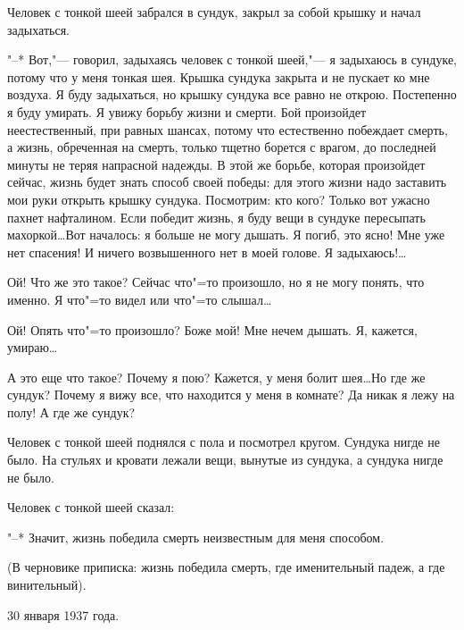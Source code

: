 Человек с тонкой шеей забрался в сундук, закрыл за собой крышку и начал задыхаться.

"--* Вот,"--- говорил, задыхаясь человек с тонкой шеей,"--- я задыхаюсь в сундуке, потому что у меня тонкая шея. Крышка сундука закрыта и не пускает ко мне воздуха. Я буду задыхаться, но крышку сундука все равно не открою. Постепенно я буду умирать. Я увижу борьбу жизни и смерти. Бой произойдет неестественный,  при равных шансах, потому что естественно  побеждает смерть, а жизнь, обреченная на смерть, только тщетно борется с врагом, до последней минуты не теряя напрасной надежды. В этой же  борьбе, которая произойдет сейчас, жизнь  будет знать способ своей победы: для этого жизни надо заставить мои руки открыть крышку сундука. Посмотрим: кто кого? Только вот ужасно пахнет нафталином. Если победит жизнь, я буду вещи в  сундуке пересыпать  махоркой\dots Вот началось: я больше не могу дышать. Я погиб, это ясно! Мне уже нет спасения! И ничего возвышенного нет в моей голове. Я задыхаюсь!\dots

Ой! Что же это такое? Сейчас что"=то произошло, но я не могу понять, что  именно. Я что"=то видел или что"=то слышал\dots

Ой! Опять что"=то произошло? Боже мой! Мне нечем дышать. Я, кажется, умираю\dots

А это еще что такое? Почему я пою? Кажется, у меня болит шея\dots Но где же сундук? Почему я вижу все, что находится у меня в комнате? Да никак я лежу на полу! А где же сундук?

Человек с тонкой шеей поднялся с пола и посмотрел кругом. Сундука нигде не было. На стульях и кровати лежали вещи, вынутые из сундука, а сундука нигде не было.

Человек с тонкой шеей сказал:

"--* Значит, жизнь победила смерть неизвестным для меня способом.

(В черновике приписка: жизнь победила смерть, где именительный падеж, а где винительный).

\begin{flushright}30 января 1937 года.\end{flushright}